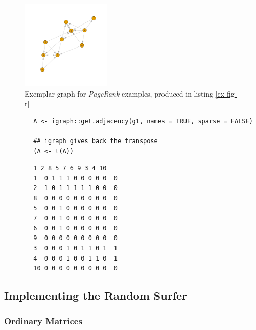 \documentclass[11pt]{report}
\begin{document}
\begin{figure}
\begin{center}
\includegraphics[width=0.38\textwidth]{media/example-graph-power-walk.png}
\end{center}
\caption{\label{example-rs-graph}Exemplar graph for \emph{PageRank} examples, produced in listing \ref{ex-fig-r}}
\end{figure}


\begin{listing}[htbp]
    \begin{tcolorbox}
        \begin{verbatim}
        A <- igraph::get.adjacency(g1, names = TRUE, sparse = FALSE)

        ## igraph gives back the transpose
        (A <- t(A))
        \end{verbatim}
        \caption{\label{adj-mat-random-surf}Return the Adjacency Matrix corresponding to figure \ref{example-rs-graph}}
    \tcblower
        \begin{verbatim}
        1 2 8 5 7 6 9 3 4 10
        1  0 1 1 1 0 0 0 0 0  0
        2  1 0 1 1 1 1 1 0 0  0
        8  0 0 0 0 0 0 0 0 0  0
        5  0 0 1 0 0 0 0 0 0  0
        7  0 0 1 0 0 0 0 0 0  0
        6  0 0 1 0 0 0 0 0 0  0
        9  0 0 0 0 0 0 0 0 0  0
        3  0 0 0 1 0 1 1 0 1  1
        4  0 0 0 1 0 0 1 1 0  1
        10 0 0 0 0 0 0 0 0 0  0
        \end{verbatim}
    \end{tcolorbox}
\end{listing}



\subsection{Implementing the Random Surfer}
\label{sec:orgb756c9c}
\subsubsection{Ordinary Matrices}
\label{implementing-page-rank-methods}
\end{document}
